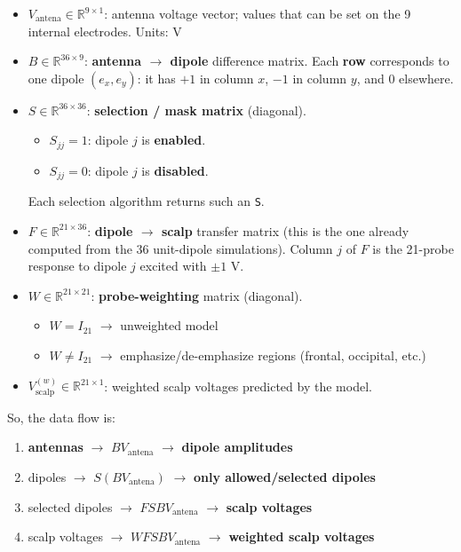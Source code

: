 \documentclass[../00_Main.tex]{subfiles}
\begin{document}
\begin{itemize}
  \item $V_{\text{antena}} \in \mathbb{R}^{9\times 1}$:  
  antenna voltage vector; values that can be set on the 9 internal electrodes. Units: V 
  
  \item $B \in \mathbb{R}^{36\times 9}$:  
  \textbf{antenna $\to$ dipole} difference matrix.  
  Each \textbf{row} corresponds to one dipole $(e_x, e_y)$: it has $+1$ in column $x$, $-1$ in column $y$, and $0$ elsewhere.

  \item $S \in \mathbb{R}^{36\times 36}$:  
  \textbf{selection / mask matrix} (diagonal).
  \begin{itemize}
    \item $S_{jj} = 1$: dipole $j$ is \textbf{enabled}.
    \item $S_{jj} = 0$: dipole $j$ is \textbf{disabled}.
  \end{itemize}
  Each selection algorithm returns such an \texttt{S}.

  \item $F \in \mathbb{R}^{21\times 36}$:  
  \textbf{dipole $\to$ scalp} transfer matrix (this is the one already computed from the 36 unit-dipole simulations).  
  Column $j$ of $F$ is the 21-probe response to dipole $j$ excited with $\pm 1$ V.

  \item $W \in \mathbb{R}^{21\times 21}$:  
  \textbf{probe-weighting} matrix (diagonal).
  \begin{itemize}
    \item $W = I_{21}$ $\to$ unweighted model
    \item $W \neq I_{21}$ $\to$ emphasize/de-emphasize regions (frontal, occipital, etc.)
  \end{itemize}

  \item $V_{\text{scalp}}^{(w)} \in \mathbb{R}^{21\times 1}$:  
  weighted scalp voltages predicted by the model.
\end{itemize}

So, the data flow is:

\begin{enumerate}
  \item \textbf{antennas} $\to$ $B V_{\text{antena}}$ $\to$ \textbf{dipole amplitudes}
  \item dipoles $\to$ $S (B V_{\text{antena}})$ $\to$ \textbf{only allowed/selected dipoles}
  \item selected dipoles $\to$ $F S B V_{\text{antena}}$ $\to$ \textbf{scalp voltages}
  \item scalp voltages $\to$ $W F S B V_{\text{antena}}$ $\to$ \textbf{weighted scalp voltages}
\end{enumerate}
\end{document}
